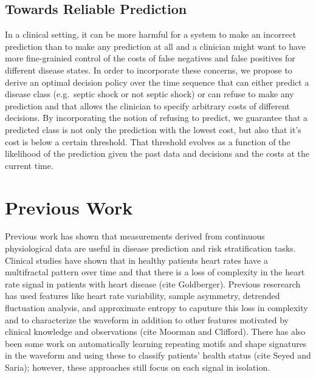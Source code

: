 \documentclass[dvips,12pt]{article}
\begin{document}
\subsection{Towards Reliable Prediction}
In a clinical setting, it can be more harmful for a system to make an incorrect prediction than to make any prediction at all and a clinician might want to have more fine-grainied control of the costs of false negatives and false positives for different disease states. In order to incorporate these concerns, we propose to derive an optimal decision policy over the time sequence that can either predict a disease class (e.g.\ septic shock or not septic shock) or can refuse to make any prediction and that allows the clinician to specify arbitrary costs of different decisions. By incorporating the notion of refusing to predict, we guarantee that a predicted class is not only the prediction with the lowest cost, but also that it's cost is below a certain threshold. That threshold evolves as a function of the likelihood of the prediction given the past data and decisions and the costs at the current time.

\section{Previous Work}
Previous work has shown that measurements derived from continuous physiological data are useful in disease prediction and risk stratification tasks. Clinical studies have shown that in healthy patients heart rates have a multifractal pattern over time and that there is a loss of complexity in the heart rate signal in patients with heart disease (cite Goldberger). Previous reserearch has used features like heart rate variability, sample asymmetry, detrended fluctuation analysis, and approximate entropy to caputure this loss in complexity and to characterize the waveform in addition to other features motivated by clinical knowledge and observations (cite Moorman and Clifford).  There has also been some work on automatically learning repeating motifs and shape signatures in  the waveform and using these to classify patients' health status (cite Seyed and Saria); however, these approaches still focus on each signal in isolation.




\end{document}
